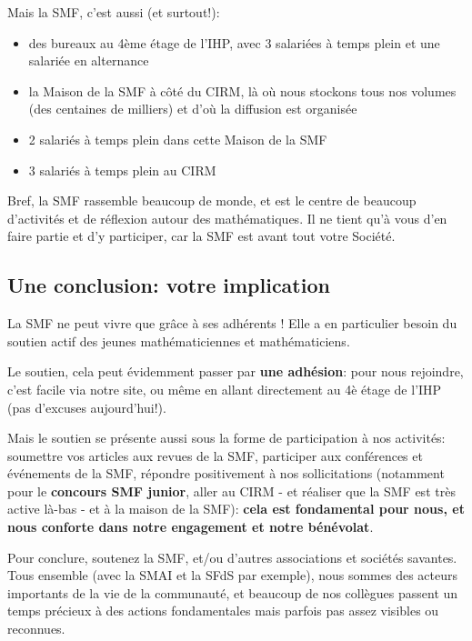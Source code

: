 Mais la SMF, c'est aussi (et surtout!):

\begin{itemize} 
 \item des bureaux au 4\`eme \'etage de l'IHP, avec 3 salari\'ees \`a temps plein et une salari\'ee en alternance
\item la \og Maison de la SMF\fg{} \`a c\^ot\'e du CIRM, l\`a o\`u nous stockons tous nos volumes (des centaines de milliers) et d'o\`u la diffusion est organis\'ee
\item 2 salari\'es \`a temps plein dans cette Maison de la SMF
\item 3 salari\'es \`a temps plein au CIRM
\end{itemize}

Bref, la SMF rassemble beaucoup de monde, et est le centre de beaucoup d'activit\'es et de r\'eflexion autour des math\'ematiques. Il ne tient qu'\`a vous d'en faire partie et d'y participer, car la SMF est avant tout votre Soci\'et\'e.

\subsection*{Une conclusion: votre implication}





La SMF ne peut vivre que gr\^ace \`a ses adh\'{e}rents ! Elle a en particulier besoin du soutien actif des jeunes math\'ematiciennes et math\'ematiciens. 

Le soutien, cela peut \'evidemment passer par {\bf une adh\'esion}: pour nous rejoindre, c'est facile via notre site, ou m\^eme en allant directement au 4\`e \'etage de l'IHP (pas d'excuses aujourd'hui!).

Mais le soutien se pr\'esente aussi sous la forme de participation \`a nos activit\'es: soumettre vos articles aux revues de la SMF, participer aux conf\'erences et \'ev\'enements de la SMF, r\'epondre positivement \`a nos sollicitations (notamment pour le {\bf concours SMF junior}, aller au CIRM - et r\'ealiser que la SMF est tr\`es active l\`a-bas - et \`a la maison de la SMF):  {\bf cela est fondamental pour nous, et nous conforte dans  notre engagement et notre b\'en\'evolat}.

Pour conclure, soutenez la SMF, et/ou d'autres associations et soci\'et\'es savantes. Tous ensemble (avec la SMAI et la SFdS par exemple), nous sommes des acteurs importants de la vie de la communaut\'e, et beaucoup de nos coll\`egues passent un temps pr\'ecieux \`a des actions fondamentales mais parfois pas assez visibles ou reconnues.

